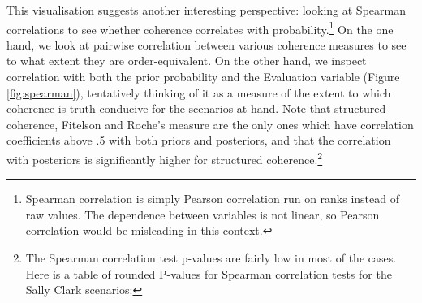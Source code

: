 \documentclass[10pt,]{scrartcl}
\begin{document}
This visualisation suggests another interesting perspective: looking at Spearman correlations to see whether coherence correlates with probability.\footnote{Spearman correlation is simply Pearson correlation run on ranks instead of raw values. The dependence between variables is not linear, so Pearson correlation would be misleading in this context.} On the one hand, we look at  pairwise correlation between various coherence measures to see to what extent they are order-equivalent. On the other hand, we inspect correlation  with both the prior probability and the Evaluation variable (Figure \ref{fig:spearman}), tentatively thinking of it as a measure of the extent to which coherence is truth-conducive for the scenarios at hand.  Note that structured coherence, Fitelson and Roche's measure are the only ones which have correlation coefficients above .5 with both priors and posteriors, and that the correlation with posteriors is significantly higher for structured coherence.\footnote{The Spearman correlation test p-values are fairly low in most of the cases. Here is a table of rounded P-values for Spearman correlation tests for the Sally Clark scenarios:

}  
\end{document}

